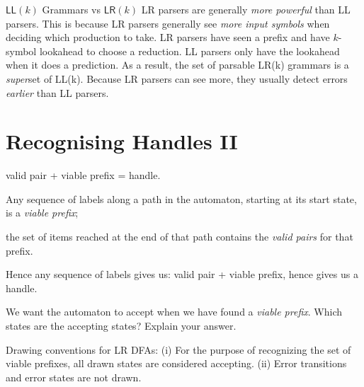 \frmrule 







\begin{sidenote}{$\textsf{LL}(k)$ Grammars vs $\textsf{LR}(k)$}
LR parsers are generally \textit{more powerful} than LL parsers. 
This is because LR parsers generally see \textit{more input symbols} 
when deciding which production to take. LR parsers have seen 
a prefix and have $k$-symbol lookahead to choose a reduction.  LL parsers 
only have the lookahead when it does a prediction. 
As a result, the set of parsable LR(k) grammars is a \textit{super}set of LL(k). 
Because LR parsers can see more, they usually 
detect errors \textit{earlier} than LL parsers. 
\end{sidenote}


\section{Recognising Handles II}



valid pair + viable prefix = handle. 


Any sequence of labels along a path in the %
automaton, 
starting at its start state, is a \textit{viable prefix};

the set of items reached at the end of that path contains the 
\textit{valid pairs} for that prefix. 


Hence any sequence of labels gives us: valid pair + viable prefix, 
hence gives us a handle. 

\frmrule 

\begin{example}
We want the automaton to accept when we have found a \textit{viable prefix}.
Which states are the accepting states? Explain your answer. 
\end{example}

\frmrule 

Drawing conventions for LR DFAs:
(i) For the purpose of recognizing the set of
viable preﬁxes, all drawn states are
considered accepting.
(ii) Error transitions and error states are not
drawn.

